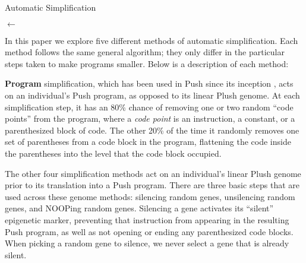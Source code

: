 \begin{algorithm}[t]
\caption{Automatic Simplification}
\label{alg:simplification}


\BlankLine

\ErrorVector $\leftarrow$ \ComputeErrors{\Ind} \;
\Return \Ind
\end{algorithm}

In this paper we explore five different methods of automatic simplification. Each method follows the same general algorithm; they only differ in the particular steps taken to make programs smaller. %
Below is a description of each method:

\textbf{Program} simplification, which has been used in Push since its inception \cite{Robinson:2001:GPtieus}, acts on an individual's Push program, as opposed to its linear Plush genome. At each simplification step, it has an 80\% chance of removing one or two random ``code points'' from the program, where a \textit{code point} is an instruction, a constant, or a parenthesized block of code. The other 20\% of the time it randomly removes one set of parentheses from a code block in the program, flattening the code inside the parentheses into the level that the code block occupied.

The other four simplification methods act on an individual's linear Plush genome prior to its translation into a Push program. There are three basic steps that are used across these genome methods: silencing random genes, unsilencing random genes, and NOOPing random genes. Silencing a gene activates its ``silent'' epigenetic marker, preventing that instruction from appearing in the resulting Push program, 
as well as not opening or ending any parenthesized code blocks. When picking a random gene to silence, we never select a gene that is already silent.

